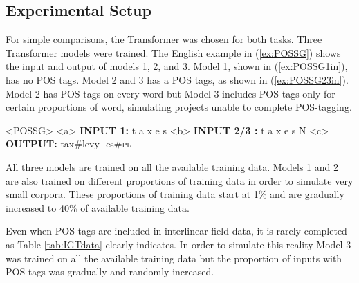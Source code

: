 \subsection{Experimental Setup}
\label{sec:segglssetup}

For simple comparisons, the Transformer was chosen for both tasks. Three Transformer models were trained. The English example in (\ref{ex:POSSG}) shows the input and output of models 1, 2, and 3. Model 1, shown in (\ref{ex:POSSG1in}), has no POS tags. Model 2 and 3 has a POS tags, as shown in (\ref{ex:POSSG23in}). Model 2 has POS tags on every word but Model 3 includes POS tags only for certain proportions of word, simulating projects unable to complete POS-tagging.

\pex<POSSG>   
\label{ex:POSSG}
\a<a> \textbf{INPUT 1:} \hspace{2 mm} t \hspace{2 mm} a \hspace{2 mm} x \hspace{2 mm} e \hspace{2 mm} s 
\label{ex:POSSG1in}
\a<b> \textbf{INPUT 2/3 :} \hspace{2 mm} t \hspace{2 mm} a \hspace{2 mm} x \hspace{2 mm} e \hspace{2 mm} s \hspace{2 mm} N
\label{ex:POSSG23in}
\a<c> \textbf{OUTPUT:} \hspace{2 mm} tax\#levy \hspace{2mm} -es\#\textsc{pl}
\label{ex:POSSGout}
\xe

All three models are trained on all the available training data. Models 1 and 2 are also trained on different proportions of training data in order to simulate very small corpora. These proportions of training data start at 1\% and are gradually increased to 40\% of available training data. 

Even when POS tags are included in interlinear field data, it is rarely completed as Table \ref{tab:IGTdata} clearly indicates.%
In order to simulate this reality Model 3 was trained on all the available training data but the proportion of inputs with POS tags was gradually and randomly increased.

